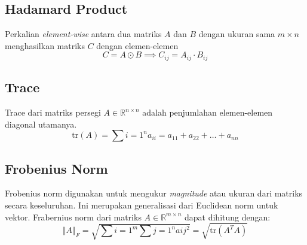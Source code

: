 \subsection{Hadamard Product}
Perkalian \textit{element-wise} antara dua matriks $A$ dan $B$ dengan ukuran sama $m \times n$ menghasilkan matriks $C$ dengan elemen-elemen
$$
C = A  \odot B \implies C_{ij} = A_{ij} \cdot B_{ij}
$$ 

\subsection{Trace}
Trace dari matriks persegi $A \in \mathbb{R}^{n \times n}$ adalah penjumlahan elemen-elemen diagonal utamanya.
$$
\mathrm{tr}(A) = \sum{i = 1}^n a_{ii} = a_{11} + a_{22} + \dots + a_{nn}
$$

\subsection{Frobenius Norm}
Frobenius norm digunakan untuk mengukur \textit{magnitude} atau ukuran dari matriks secara keseluruhan. Ini merupakan generalisasi dari Euclidean norm untuk vektor. 
Frabernius norm dari matriks $A \in \mathbb{R}^{m \times n}$ dapat dihitung dengan:
$$
\Vert A \Vert_F = \sqrt{\sum{i = 1}^m \sum{j = 1}^n a{ij}^2} = \sqrt{\mathrm{tr}(A^TA)}
$$
